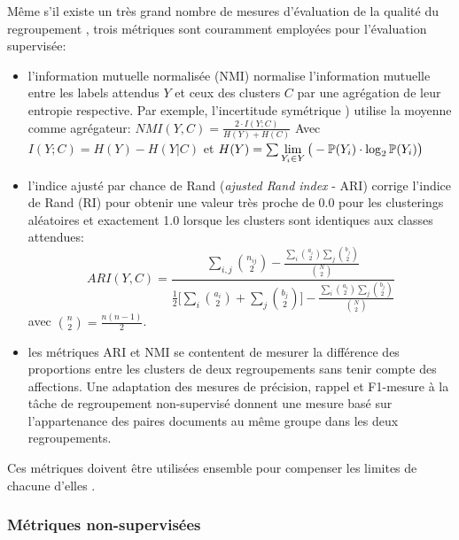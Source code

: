 Même s'il existe un très grand nombre de mesures d'évaluation de la qualité du regroupement \citep{im2003clusteringsurvey}, trois métriques sont couramment employées pour l'évaluation supervisée:
\begin{itemize}
	\item l'information mutuelle normalisée (NMI) \citep{strehl2000nmi, vinh2010clusteringComparison} normalise l'information mutuelle entre les labels attendus $Y$ et ceux des clusters $C$ par une agrégation de leur entropie respective. Par exemple, l'incertitude symétrique \citep{kvalseth1987entropy_NMI}) utilise la moyenne comme agrégateur:  $NMI(Y,C) = \frac{2 \cdot I(Y;C)}{H(Y) + H(C)} $
	Avec $I(Y;C) = H(Y) - H(Y \vert C)$ et $H(Y) = \sum\lim\limits_{Y_i \in Y}\big(- \mathbb{P}(Y_i)\cdot\log_2\mathbb{P}(Y_i)\big)$
	\item l'indice ajusté par chance de Rand (\textit{ajusted Rand index} - ARI) \citep{hubert1985adjustedrandidx} corrige l'indice de Rand (RI) \citep{rand1971randidx} pour obtenir une valeur très proche de 0.0 pour les clusterings aléatoires et exactement 1.0 lorsque les clusters sont identiques aux classes attendues: %
	\[ARI(Y,C) = \frac{\sum\limits_{i,j}\binom{n_{ij}}{2} - \frac{\sum\limits_{i}\binom{a_{i}}{2}\sum\limits_{j}\binom{b_{j}}{2}}{\binom{N}{2}}}{\frac{1}{2}\big[\sum\limits_{i}\binom{a_{i}}{2}+\sum\limits_{j}\binom{b_{j}}{2}\big] - \frac{\sum\limits_{i}\binom{a_{i}}{2}\sum\limits_{j}\binom{b_{j}}{2}}{\binom{N}{2}}}\]
	avec $\binom{n}{2} = \frac{n(n-1)}{2}$.
	\item les métriques ARI et NMI se contentent de mesurer la différence des proportions entre les clusters de deux regroupements sans tenir compte des affections. Une adaptation des mesures de précision, rappel et F1-mesure à la tâche de regroupement non-supervisé donnent une mesure basé sur l'appartenance des paires documents au même groupe dans les deux regroupements.
\end{itemize}
Ces métriques doivent être utilisées ensemble  pour compenser les limites de chacune d'elles \citep{yang2017kmeansfriendlyspaces}.



\subsubsection{Métriques non-supervisées}
\label{sec:similarite:biblio:unsupeval}

